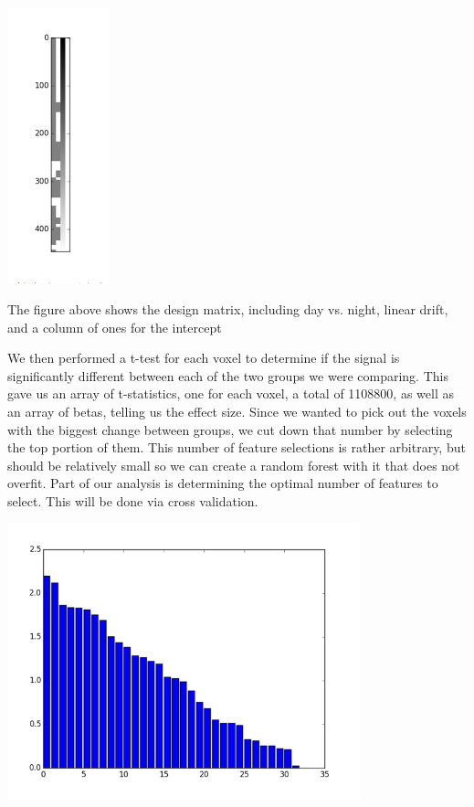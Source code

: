 \documentclass[11pt]{article}
\begin{document}
\begin{center}
\includegraphics[height=8cm]{2}
\end{center}

The figure above shows the design matrix, including day vs. night, linear drift, and a column of ones for the intercept

We then performed a t-test for each voxel to determine if the signal is
significantly different between each of the two groups we were comparing.
This gave us an array of t-statistics, one for each voxel, a total of 1108800,
as well as an array of betas, telling us the effect size.  Since we wanted to
pick out the voxels with the biggest change between groups, we cut down that
number by selecting the top portion of them.  This number of feature
selections is rather arbitrary, but should be relatively small so we can
create a random forest with it that does not overfit.  Part of our analysis is
determining the optimal number of features to select. This will be done via
cross validation.

\begin{center}
\includegraphics[height=8cm]{3}
\end{center}
\end{document}
